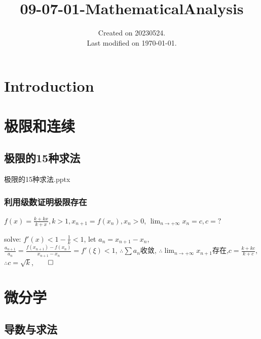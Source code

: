 \documentclass[UTF8]{../../09-Mathematics}
\begin{document}
\title{09-07-01-MathematicalAnalysis}
\date{Created on 20230524.\\   Last modified on \today.}
\maketitle
\tableofcontents


\chapter{Introduction}






\chapter{极限和连续}




\section{极限的15种求法}

极限的15种求法.pptx




\subsection{利用级数证明极限存在}


\begin{question}
    $f(x) = \frac{k+kx}{k+x}, k>1, x_{n+1}=f(x_n),x_n>0$, $\lim_{n\to+\infty}x_n =c,c=? $

    solve: $f'(x)<1-\frac{1}{k}<1$, let $a_n =x_{n+1}-x_{n}$, $\frac{a_{n+1}}{a_{n}}=  \frac{f(x_{n+1})-f(x_{n})}{x_{n+1}-x_{n}}=f'(\xi )<1$, $\therefore \sum a_n$收敛, $\therefore \lim_{n\to+\infty}x_{n+1} $存在,$c=\frac{k+kc}{k+c}$,$\therefore c=\sqrt{k} $,$\qed$
\end{question} 









\chapter{微分学}


\section{导数与求法}
\end{document}
